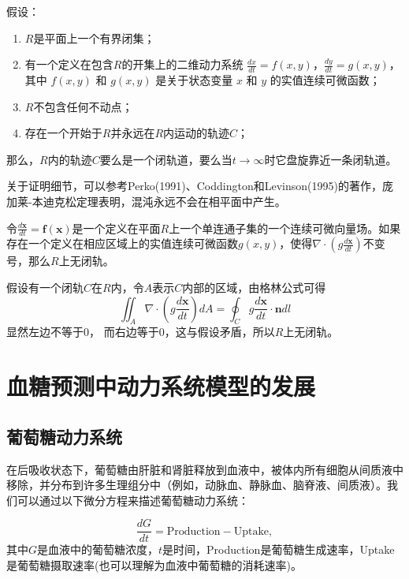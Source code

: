 \begin{thm}
    假设：
    \begin{enumerate}
        \item $R$是平面上一个有界闭集；
        \item 有一个定义在包含$R$的开集上的二维动力系统 $\frac{dx}{dt} = f(x, y)$，$\frac{dy}{dt} = g(x, y)$，其中 $f(x, y)$ 和 $g(x, y)$ 是关于状态变量 $x$ 和 $y$ 的实值连续可微函数；
        \item $R$不包含任何不动点；
        \item 存在一个开始于$R$并永远在$R$内运动的轨迹$C$；
    \end{enumerate}
    那么，$R$内的轨迹$C$要么是一个闭轨道，要么当$t \to \infty$时它盘旋靠近一条闭轨道。
\end{thm}

关于证明细节，可以参考Perko(1991)、Coddington和Levinson(1995)的著作，庞加莱-本迪克松定理表明，混沌永远不会在相平面中产生\cite{strogatz2018nonlinear}。

\begin{thm}[Dulac准则]
    令$\frac{d\mathbf{x}}{dt}=\mathbf{f}(\mathbf{x})$是一个定义在平面$R$上一个单连通子集的一个连续可微向量场。如果存在一个定义在相应区域上的实值连续可微函数$g(x, y)$，使得$\nabla \cdot (g \frac{d\mathbf{x}}{dt})$不变号，那么$R$上无闭轨。
\end{thm}
\begin{pf}
    假设有一个闭轨$C$在$R$内，令$A$表示$C$内部的区域，由格林公式可得
    \[ \iint_A \nabla \cdot(g \frac{d\mathbf{x}}{dt})dA=\oint_C g \frac{d\mathbf{x}}{dt}\cdot \mathbf{n}dl \]
    显然左边不等于0， 而右边等于0，这与假设矛盾，所以$R$上无闭轨。
\end{pf}

\section{血糖预测中动力系统模型的发展}
\subsection{葡萄糖动力系统}
在后吸收状态下，葡萄糖由肝脏和肾脏释放到血液中，被体内所有细胞从间质液中移除，并分布到许多生理组分中（例如，动脉血、静脉血、脑脊液、间质液）。我们可以通过以下微分方程来描述葡萄糖动力系统\cite{bergman1979quantitative}：

\begin{equation}\label{1}
    \frac{dG}{dt} = \text{Production} - \text{Uptake},
\end{equation}
其中$G$是血液中的葡萄糖浓度，$t$是时间，Production是葡萄糖生成速率，Uptake是葡萄糖摄取速率(也可以理解为血液中葡萄糖的消耗速率)。

